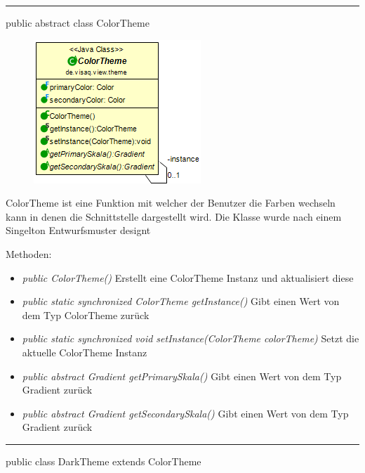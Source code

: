 

\rule{\textwidth}{0.4pt}
public abstract class ColorTheme

\begin{minipage}{0.3\textwidth}
    \begin{figure}[H]
        \includegraphics[scale = 0.5]{media/frontend/view/de.view.elements.theme/ColorTheme_Class.png}
    \end{figure}
    \end{minipage} \hfill
    \begin{minipage}{0.6\textwidth}
ColorTheme ist eine Funktion mit welcher der Benutzer die Farben wechseln kann in denen die Schnittstelle dargestellt wird. Die Klasse wurde nach einem Singelton Entwurfsmuster designt
\end{minipage}

Methoden:
\begin{itemize}
    \item \emph{public ColorTheme()} Erstellt eine ColorTheme Instanz und aktualisiert diese
    \item \emph{public static synchronized ColorTheme getInstance()} Gibt einen Wert von dem Typ ColorTheme zurück
    \item \emph{public static synchronized void setInstance(ColorTheme colorTheme)} Setzt die aktuelle ColorTheme Instanz
    \item \emph{public abstract Gradient getPrimarySkala()} Gibt einen Wert von dem Typ Gradient zurück
    \item \emph{public abstract Gradient getSecondarySkala()}  Gibt einen Wert von dem Typ Gradient zurück
\end{itemize}

\rule{\textwidth}{0.4pt}
public class DarkTheme extends ColorTheme

